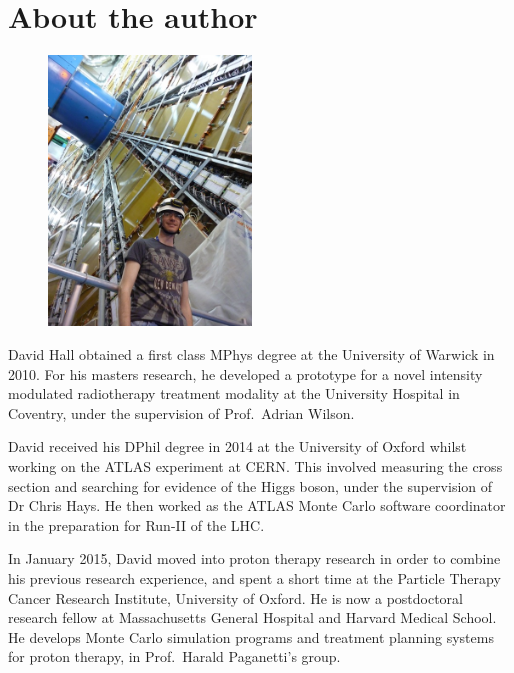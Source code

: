 
\chapter*{About the author}
\thispagestyle{plain}

\begin{figure}
	\vspace{-20pt}
	\centering
	\includegraphics[width=0.48\textwidth]{tex/david_photo}
	\vspace{-20pt}
\end{figure}

David Hall obtained a first class MPhys degree at the University of Warwick in 2010. For his 
masters research, he developed a prototype for a novel intensity modulated radiotherapy 
treatment modality at the University Hospital in Coventry, under the supervision of Prof.\ 
Adrian Wilson.

David received his DPhil degree in 2014 at the University of Oxford whilst working on the 
ATLAS experiment at CERN. This involved measuring the \WW cross section and searching for 
evidence of the Higgs boson, under the supervision of Dr Chris Hays. He then worked as the 
ATLAS Monte Carlo software coordinator in the preparation for Run-II of the LHC.

In January 2015, David moved into proton therapy research in order to combine his previous 
research experience, and spent a short time at the Particle Therapy Cancer Research 
Institute, University of Oxford. He is now a postdoctoral research fellow at Massachusetts 
General Hospital and Harvard Medical School. He develops Monte Carlo simulation programs and 
treatment planning systems for proton therapy, in Prof.\ Harald Paganetti's group.

\nocite{HWW-RunI-submit,ATLAS:combination:2013,YR3,ATLAS-discovery,WW-7TeV,WW-1ifb,VersatileLinkConnectors,VersatileLinkFibres,VersatileLink}

\let\oldbibname\bibname
\renewcommand{\bibname}{Selected publications}


\let\bibname\oldbibname
